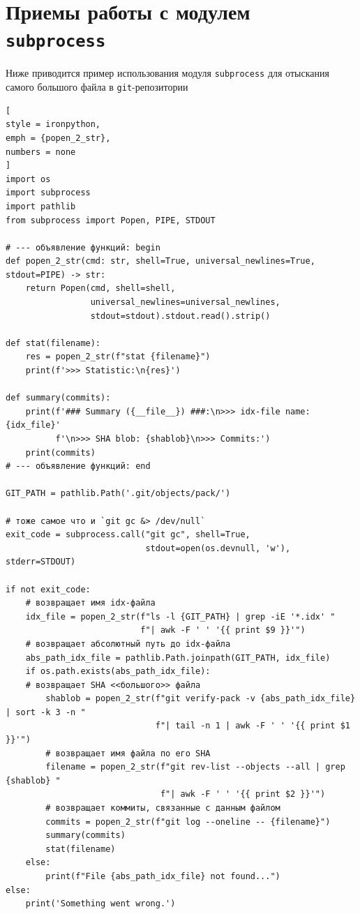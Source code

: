 \documentclass[%
	11pt,
	a4paper,
	utf8,
		]{article}
\begin{document}
\section{Приемы работы с модулем \texttt{subprocess}}

Ниже приводится пример использования модуля \texttt{subprocess} для отыскания самого большого файла в \texttt{git}-репозитории
\begin{lstlisting}[
style = ironpython,
emph = {popen_2_str},
numbers = none
]
import os
import subprocess
import pathlib
from subprocess import Popen, PIPE, STDOUT

# --- объявление функций: begin
def popen_2_str(cmd: str, shell=True, universal_newlines=True, stdout=PIPE) -> str:
    return Popen(cmd, shell=shell,
                 universal_newlines=universal_newlines,
                 stdout=stdout).stdout.read().strip()

def stat(filename):
    res = popen_2_str(f"stat {filename}")
    print(f'>>> Statistic:\n{res}')

def summary(commits):
    print(f'### Summary ({__file__}) ###:\n>>> idx-file name: {idx_file}'
          f'\n>>> SHA blob: {shablob}\n>>> Commits:')
    print(commits)
# --- объявление функций: end

GIT_PATH = pathlib.Path('.git/objects/pack/')

# тоже самое что и `git gc &> /dev/null`
exit_code = subprocess.call("git gc", shell=True,
                            stdout=open(os.devnull, 'w'), stderr=STDOUT)

if not exit_code:
    # возвращает имя idx-файла
    idx_file = popen_2_str(f"ls -l {GIT_PATH} | grep -iE '*.idx' "
                           f"| awk -F ' ' '{{ print $9 }}'")
    # возвращает абсолютный путь до idx-файла
    abs_path_idx_file = pathlib.Path.joinpath(GIT_PATH, idx_file)
    if os.path.exists(abs_path_idx_file):
    # возвращает SHA <<большого>> файла
        shablob = popen_2_str(f"git verify-pack -v {abs_path_idx_file} | sort -k 3 -n "
                              f"| tail -n 1 | awk -F ' ' '{{ print $1 }}'")
        # возвращает имя файла по его SHA
        filename = popen_2_str(f"git rev-list --objects --all | grep {shablob} "
                               f"| awk -F ' ' '{{ print $2 }}'")
        # возвращает коммиты, связанные с данным файлом
        commits = popen_2_str(f"git log --oneline -- {filename}")
        summary(commits)
        stat(filename)
    else:
        print(f"File {abs_path_idx_file} not found...")
else:
    print('Something went wrong.')
\end{lstlisting}
\end{document}
